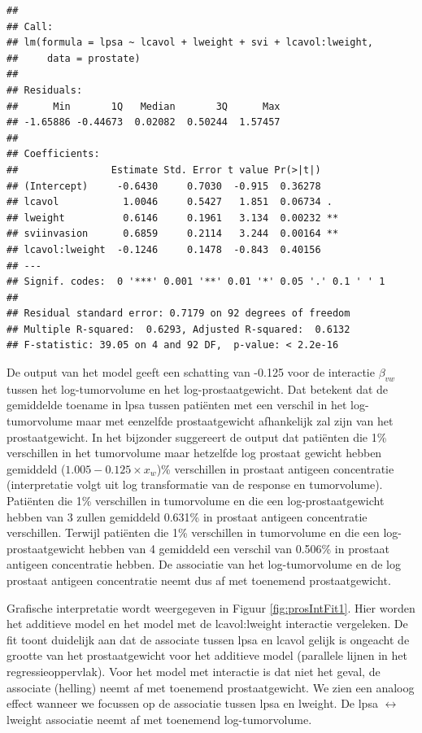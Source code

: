 \documentclass[
  12pt,dutch]{book}
\theoremstyle{definition}
\theoremstyle{definition}
\theoremstyle{definition}
\theoremstyle{definition}
\theoremstyle{remark}
\begin{document}
\begin{verbatim}
## 
## Call:
## lm(formula = lpsa ~ lcavol + lweight + svi + lcavol:lweight, 
##     data = prostate)
## 
## Residuals:
##      Min       1Q   Median       3Q      Max 
## -1.65886 -0.44673  0.02082  0.50244  1.57457 
## 
## Coefficients:
##                Estimate Std. Error t value Pr(>|t|)   
## (Intercept)     -0.6430     0.7030  -0.915  0.36278   
## lcavol           1.0046     0.5427   1.851  0.06734 . 
## lweight          0.6146     0.1961   3.134  0.00232 **
## sviinvasion      0.6859     0.2114   3.244  0.00164 **
## lcavol:lweight  -0.1246     0.1478  -0.843  0.40156   
## ---
## Signif. codes:  0 '***' 0.001 '**' 0.01 '*' 0.05 '.' 0.1 ' ' 1
## 
## Residual standard error: 0.7179 on 92 degrees of freedom
## Multiple R-squared:  0.6293, Adjusted R-squared:  0.6132 
## F-statistic: 39.05 on 4 and 92 DF,  p-value: < 2.2e-16
\end{verbatim}

De output van het model geeft een schatting van -0.125 voor de interactie \(\beta_{vw}\) tussen het log-tumorvolume en het log-prostaatgewicht. Dat betekent dat de gemiddelde toename in lpsa tussen patiënten met een verschil in het log-tumorvolume maar met eenzelfde prostaatgewicht afhankelijk zal zijn van het prostaatgewicht.
In het bijzonder suggereert de output dat patiënten die 1\% verschillen in het tumorvolume maar hetzelfde log prostaat gewicht hebben gemiddeld (\(1.005-0.125 \times x_w\))\% verschillen in prostaat antigeen concentratie (interpretatie volgt uit log transformatie van de response en tumorvolume).
Patiënten die 1\% verschillen in tumorvolume en die een log-prostaatgewicht hebben van 3 zullen gemiddeld 0.631\% in prostaat antigeen concentratie verschillen. Terwijl patiënten die 1\% verschillen in tumorvolume en die een log-prostaatgewicht hebben van 4 gemiddeld een verschil van 0.506\% in prostaat antigeen concentratie hebben. De associatie van het log-tumorvolume en de log prostaat antigeen concentratie neemt dus af met toenemend prostaatgewicht.

Grafische interpretatie wordt weergegeven in Figuur \ref{fig:prosIntFit1}. Hier worden het additieve model en het model met de lcavol:lweight interactie vergeleken. De fit toont duidelijk aan dat de associate tussen lpsa en lcavol gelijk is ongeacht de grootte van het prostaatgewicht voor het additieve model (parallele lijnen in het regressieoppervlak). Voor het model met interactie is dat niet het geval, de associate (helling) neemt af met toenemend prostaatgewicht. We zien een analoog effect wanneer we focussen op de associatie tussen lpsa en lweight. De lpsa \(\leftrightarrow\) lweight associatie neemt af met toenemend log-tumorvolume.
\end{document}
